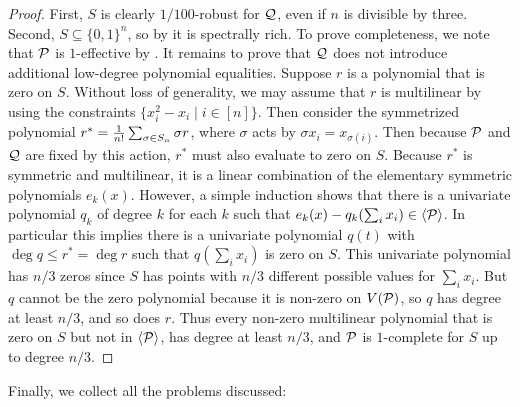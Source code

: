 \begin{proof}
First, $S$ is clearly $1/100$-robust for $\mathcal Q$, even if $n$ is divisible by three. Second, $S \subseteq \{0,1\}^n$, so by  it is spectrally rich. To prove completeness, we note that $\mathcal P$ is $1$-effective by . It remains to prove that $\mathcal Q$ does not introduce additional low-degree polynomial equalities. 
Suppose $r$ is a polynomial that is zero on $S$.  
Without loss of generality, we may assume that $r$ is multilinear by using the constraints $\{x_i^2 - x_i \mid i \in [n]\}$.
Then consider the symmetrized polynomial $r^* = \frac{1}{n!}\sum_{\sigma \in S_{n}} \sigma r$, where $\sigma$ acts by $\sigma x_i = x_{\sigma(i)}$. Then because $\mathcal P$ and $\mathcal Q$ are fixed by this action, $r^*$ must also evaluate to zero on $S$. Because $r^*$ is symmetric and multilinear, it is a linear combination of the elementary symmetric polynomials $e_k(x)$. However, a simple induction shows that there is a univariate polynomial $q_k$ of degree $k$ for each $k$ such that $e_k(x) - q_k(\sum_i x_i) \in \langle \mathcal P \rangle$. In particular this implies there is a univariate polynomial $q(t)$ with $\deg q \leq r^* = \deg r$ such that $q(\sum_i x_i)$ is zero on $S$.
This univariate polynomial has $n/3$ zeros since $S$ has points with $n/3$ different possible values for $\sum_i x_i$. But $q$ cannot be the zero polynomial because it is non-zero on $V(\mathcal P)$, so $q$ has degree at least $n/3$, and so does $r$. Thus every non-zero multilinear polynomial that is zero on $S$ but not in $\langle \mathcal P\rangle$, has degree at least $n/3$, and $\mathcal P$ is $1$-complete for $S$ up to degree $n/3$.
\end{proof}
Finally, we collect all the problems discussed:
